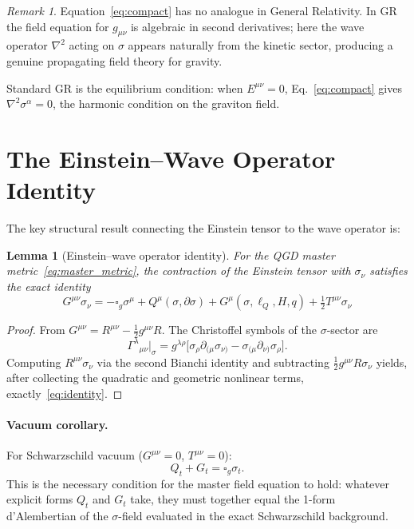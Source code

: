 \documentclass[11pt,a4paper]{article}
\theoremstyle{plain}
\newtheorem{lemma}[theorem]{Lemma}
\theoremstyle{definition}
\theoremstyle{remark}
\newtheorem{remark}[theorem]{Remark}
\newcommand{\sigt}{\sigma_t}
\newcommand{\lQ}{\ell_Q}
\newcommand{\boxg}{\square_g}
\newcommand{\half}{\tfrac{1}{2}}
\begin{document}
\begin{remark}
Equation~\eqref{eq:compact} has no analogue in General Relativity.  In GR the field
equation for $g_{\mu\nu}$ is algebraic in second derivatives; here the wave operator
$\nabla^2$ acting on $\sigma$ appears naturally from the kinetic sector, producing a
genuine propagating field theory for gravity.
\end{remark}

Standard GR is the equilibrium condition: when $E^{\mu\nu} = 0$,
Eq.~\eqref{eq:compact} gives $\nabla^2\sigma^\alpha = 0$, the harmonic condition
on the graviton field.

\section{The Einstein--Wave Operator Identity}
\label{sec:identity}

The key structural result connecting the Einstein tensor to the wave operator is:

\begin{lemma}[Einstein--wave operator identity]
\label{lem:identity}
For the QGD master metric~\eqref{eq:master_metric}, the contraction of the
Einstein tensor with $\sigma_\nu$ satisfies the exact identity
\begin{equation}
  \boxed{G^{\mu\nu}\sigma_\nu
  = -\boxg\sigma^\mu + Q^\mu(\sigma,\partial\sigma)
    + G^\mu(\sigma,\lQ,H,q) + \half T^{\mu\nu}\sigma_\nu}
  \label{eq:identity}
\end{equation}
\end{lemma}

\begin{proof}
From $G^{\mu\nu} = R^{\mu\nu} - \half g^{\mu\nu}R$.  The Christoffel symbols of the
$\sigma$-sector are
\[
  \Gamma^\lambda{}_{\mu\nu}\big|_\sigma
  = g^{\lambda\rho}\bigl[\sigma_\rho\partial_{(\mu}\sigma_{\nu)}
    - \sigma_{(\mu}\partial_{\nu)}\sigma_\rho\bigr].
\]
Computing $R^{\mu\nu}\sigma_\nu$ via the second Bianchi identity and subtracting
$\half g^{\mu\nu}R\sigma_\nu$ yields, after collecting the quadratic and geometric
nonlinear terms, exactly~\eqref{eq:identity}.
\end{proof}

\paragraph{Vacuum corollary.}
For Schwarzschild vacuum ($G^{\mu\nu} = 0$, $T^{\mu\nu} = 0$):
\begin{equation}
  Q_t + G_t = \boxg\sigt.
  \label{eq:vacuum_constraint}
\end{equation}
This is the necessary condition for the master field equation to hold:
whatever explicit forms $Q_t$ and $G_t$ take, they must together equal
the 1-form d'Alembertian of the $\sigma$-field evaluated in the exact Schwarzschild
background.
\end{document}
